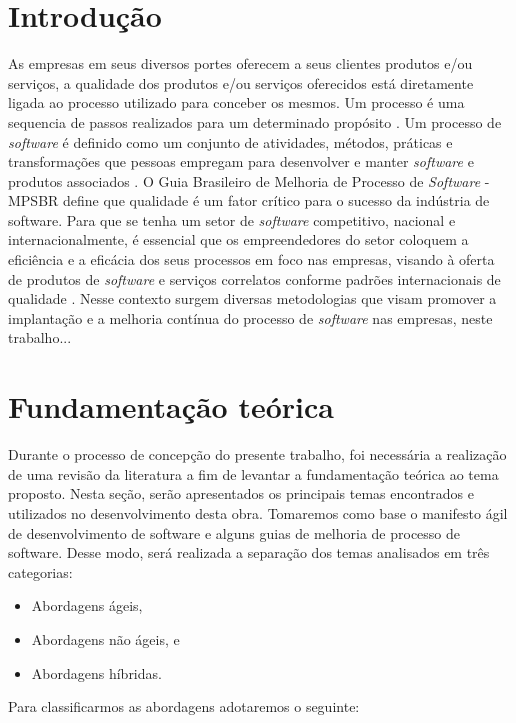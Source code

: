 \documentclass{acm_proc_article-sp}
\begin{document}
\section{Introdução}
As empresas em seus diversos portes oferecem a seus clientes produtos e/ou serviços, a qualidade dos produtos e/ou serviços oferecidos está diretamente ligada ao processo utilizado para conceber os mesmos. Um processo é uma sequencia de passos realizados para um determinado propósito \cite{ieee}. Um processo de \textit{software} é definido como um conjunto de atividades, métodos, práticas e transformações que pessoas empregam para desenvolver e manter \textit{software} e produtos associados \cite{weber}. O Guia Brasileiro de Melhoria de Processo de \textit{Software} - MPSBR define que qualidade é um fator crítico para o sucesso
da indústria de software. Para que se tenha um setor de \textit{software} competitivo, nacional e internacionalmente, é essencial que os empreendedores do setor coloquem a eficiência e a eficácia dos seus processos em foco nas empresas,
visando à oferta de produtos de \textit{software} e serviços correlatos conforme padrões internacionais de qualidade \cite{mpsbr:nAgil}. Nesse contexto surgem diversas metodologias que visam promover a implantação e a melhoria contínua do processo de \textit{software} nas empresas, neste trabalho...

\section{Fundamentação teórica}
Durante o processo de concepção do presente trabalho, foi necessária a realização de uma revisão da literatura a fim de levantar a fundamentação teórica ao tema proposto. Nesta seção, serão apresentados os principais temas encontrados e utilizados no desenvolvimento desta obra. Tomaremos como base o manifesto ágil de desenvolvimento de software \cite{manifesto:agil} e alguns guias de melhoria de processo de software. Desse modo, será realizada a separação dos temas analisados em três categorias:

\begin{itemize}
\item Abordagens ágeis,
\item Abordagens não ágeis, e
\item Abordagens híbridas.
\end{itemize}

Para classificarmos as abordagens adotaremos o seguinte: 
\end{document}

